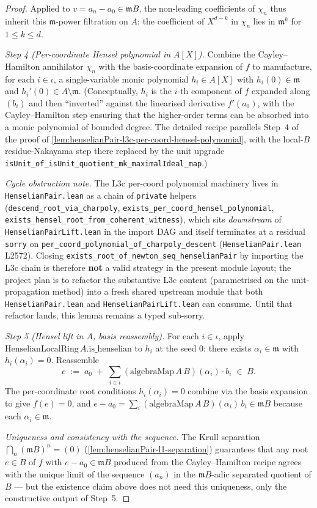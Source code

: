 \begin{proof}
Applied to $v = a_n - a_0 \in \mathfrak m B$, the non-leading
coefficients of $\chi_n$ thus inherit this $\mathfrak m$-power
filtration on $A$: the coefficient of $X^{d-k}$ in $\chi_n$ lies in
$\mathfrak m^k$ for $1 \le k \le d$.

\emph{Step 4 (Per-coordinate Hensel polynomial in $A[X]$).} Combine
the Cayley--Hamilton annihilator $\chi_n$ with the basis-coordinate
expansion of $f$ to manufacture, for each $i \in \iota$, a
single-variable monic polynomial $h_i \in A[X]$ with $h_i(0) \in
\mathfrak m$ and $h_i'(0) \in A \setminus \mathfrak m$. (Conceptually,
$h_i$ is the $i$-th component of $f$ expanded along $(b_i)$ and then
``inverted'' against the linearised derivative $f'(a_0)$, with the
Cayley--Hamilton step ensuring that the higher-order terms can be
absorbed into a monic polynomial of bounded degree. The detailed
recipe parallels Step~4 of the proof of
\cref{lem:henselianPair-l3c-per-coord-hensel-polynomial}, with the
local-$B$ residue-Nakayama step there replaced by the unit upgrade
\texttt{isUnit\_of\_isUnit\_quotient\_mk\_maximalIdeal\_map}.)

\emph{Cycle obstruction note.} The L3c per-coord polynomial machinery
lives in \texttt{HenselianPair.lean} as a chain of \texttt{private}
helpers (\texttt{descend\_root\_via\_charpoly},
\texttt{exists\_per\_coord\_hensel\_polynomial},
\texttt{exists\_hensel\_root\_from\_coherent\_witness}), which sits
\emph{downstream} of \texttt{HenselianPairLift.lean} in the import
DAG and itself terminates at a residual \texttt{sorry} on
\texttt{per\_coord\_polynomial\_of\_charpoly\_descent}
(\texttt{HenselianPair.lean} L2572). Closing
\texttt{exists\_root\_of\_newton\_seq\_henselianPair} by importing
the L3c chain is therefore \textbf{not} a valid strategy in the
present module layout; the project plan is to refactor the
substantive L3c content (parametrised on the unit-propagation
method) into a fresh shared upstream module that both
\texttt{HenselianPair.lean} and \texttt{HenselianPairLift.lean} can
consume. Until that refactor lands, this lemma remains a typed
sub-sorry.

\emph{Step 5 (Hensel lift in $A$, basis reassembly).} For each $i \in
\iota$, apply $\mathrm{HenselianLocalRing}\,A\mathrm{.is\_henselian}$
to $h_i$ at the seed $0$: there exists $\alpha_i \in \mathfrak m$
with $h_i(\alpha_i) = 0$. Reassemble
\[
  e \;:=\; a_0 \;+\; \sum_{i \in \iota}
  (\mathrm{algebraMap}\,A\,B)(\alpha_i) \cdot b_i \;\in\; B.
\]
The per-coordinate root conditions $h_i(\alpha_i) = 0$ combine via the
basis expansion to give $f(e) = 0$, and $e - a_0 = \sum_i
(\mathrm{algebraMap}\,A\,B)(\alpha_i)\,b_i \in \mathfrak m B$ because
each $\alpha_i \in \mathfrak m$.

\emph{Uniqueness and consistency with the sequence.} The Krull
separation $\bigcap_n (\mathfrak m B)^n = (0)$
(\cref{lem:henselianPair-l1-separation}) guarantees that any root $e
\in B$ of $f$ with $e - a_0 \in \mathfrak m B$ produced from the
Cayley--Hamilton recipe agrees with the unique limit of the sequence
$(a_n)$ in the $\mathfrak m B$-adic separated quotient of $B$ — but
the existence claim above does not need this uniqueness, only the
constructive output of Step~5.
\end{proof}

